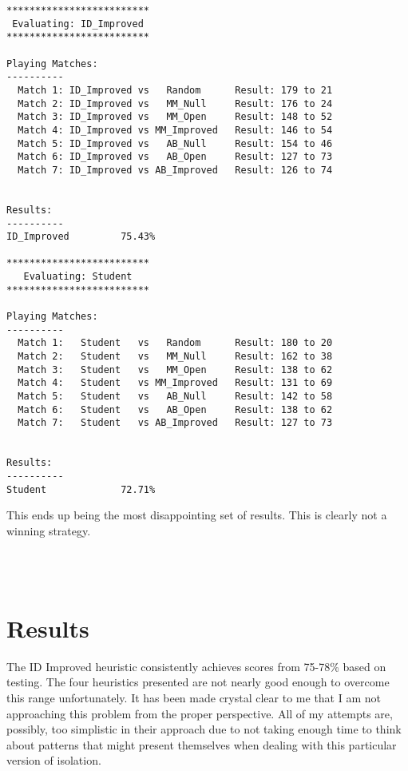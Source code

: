 \documentclass[10pt, a4paper]{article}
\begin{document}
\begin{verbatim}
*************************
 Evaluating: ID_Improved 
*************************

Playing Matches:
----------
  Match 1: ID_Improved vs   Random    	Result: 179 to 21
  Match 2: ID_Improved vs   MM_Null   	Result: 176 to 24
  Match 3: ID_Improved vs   MM_Open   	Result: 148 to 52
  Match 4: ID_Improved vs MM_Improved 	Result: 146 to 54
  Match 5: ID_Improved vs   AB_Null   	Result: 154 to 46
  Match 6: ID_Improved vs   AB_Open   	Result: 127 to 73
  Match 7: ID_Improved vs AB_Improved 	Result: 126 to 74


Results:
----------
ID_Improved         75.43%

*************************
   Evaluating: Student   
*************************

Playing Matches:
----------
  Match 1:   Student   vs   Random    	Result: 180 to 20
  Match 2:   Student   vs   MM_Null   	Result: 162 to 38
  Match 3:   Student   vs   MM_Open   	Result: 138 to 62
  Match 4:   Student   vs MM_Improved 	Result: 131 to 69
  Match 5:   Student   vs   AB_Null   	Result: 142 to 58
  Match 6:   Student   vs   AB_Open   	Result: 138 to 62
  Match 7:   Student   vs AB_Improved 	Result: 127 to 73


Results:
----------
Student             72.71%
\end{verbatim}

This ends up being the most disappointing set of results.  This is clearly not
a winning strategy.

\section{}

\begin{lstlisting}[language=Python]
\end{lstlisting}

\begin{verbatim}
\end{verbatim}

\section{Results}

The ID Improved heuristic consistently achieves scores from 75-78\% based on testing.
The four heuristics presented are not nearly good enough to overcome this range unfortunately.
It has been made crystal clear to me that I am not approaching this problem from the proper
perspective.  All of my attempts are, possibly, too simplistic in their approach due to not
taking enough time to think about patterns that might present themselves when dealing with
this particular version of isolation.
\end{document}
